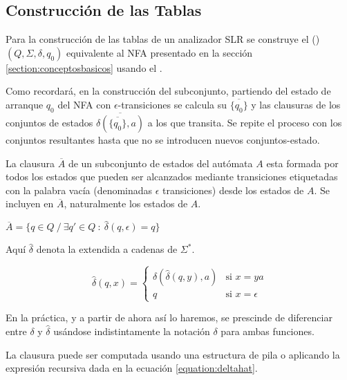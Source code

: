\subsection{Construcción de las Tablas}
\label{subsection:nfa2dfa}

Para la construcción de las tablas de un analizador SLR
se construye el  () 
$(Q, \Sigma, \delta, q_0)$ equivalente al NFA 
presentado en la sección
\ref{section:conceptosbasicos}
usando el .

Como recordará, en la construcción del subconjunto,
partiendo del estado de arranque $q_0$ del NFA con $\epsilon$-transiciones
se calcula su  $\overline{\{q_0\}}$ y las 
clausuras de los conjuntos de estados $\overline{\delta(\overline{\{q_0\}},a)}$ 
a los que transita.  Se repite el proceso
con los conjuntos resultantes hasta que no se introducen nuevos
conjuntos-estado.

La clausura $\overline{A}$ de un subconjunto de estados del autómata $A$ esta formada
por todos los estados que pueden ser alcanzados mediante transiciones
etiquetadas con la palabra vacía (denominadas $\epsilon$ transiciones)
desde los estados de $A$. Se incluyen en $\overline{A}$, naturalmente los estados 
de $A$.

\begin{center}
$\overline{A} = \{ q \in Q\ /\  \exists q' \in Q\ :\ \hat{\delta}(q, \epsilon) = q \}$
\end{center}

Aquí $\hat{\delta}$ denota la  extendida  a cadenas
de $\Sigma^*$.

\begin{equation}
\label{equation:deltahat}
\hat{\delta}(q, x) = \left \{ \begin{array}{ll}
                         \delta(\hat{\delta}(q,y),a) & \mbox{si $x = ya$} \\
                         q & \mbox{si $x = \epsilon$} 
                      \end{array}
             \right.  
\end{equation}

En la práctica, y a partir de ahora así lo haremos, se prescinde de diferenciar
entre $\delta$ y $\hat{\delta}$ usándose indistintamente la notación
$\delta$ para ambas funciones.

La clausura puede ser computada usando una estructura de pila o aplicando 
la expresión recursiva dada en la ecuación \ref{equation:deltahat}.


